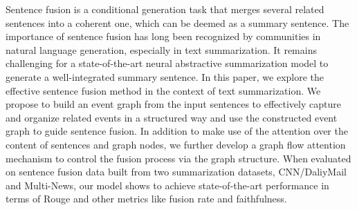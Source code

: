 Sentence fusion is a conditional generation task that merges several related sentences into a coherent one, which can be deemed as a summary sentence. The importance of sentence fusion has long been recognized by communities in natural language generation, especially in text summarization. It remains challenging for a state-of-the-art neural abstractive summarization model to generate a well-integrated summary sentence. In this paper, we explore the effective sentence fusion method in the context of text summarization. We propose to build an event graph from the input sentences to effectively capture and organize related events in a structured way and use the constructed event graph to guide sentence fusion. In addition to make use of the attention over the content of sentences and graph nodes, we further develop a graph flow attention mechanism to control the fusion process via the graph structure. When evaluated on sentence fusion data built from two summarization datasets, CNN/DaliyMail and Multi-News, our model shows to achieve state-of-the-art performance in terms of Rouge and other metrics like fusion rate and faithfulness.
